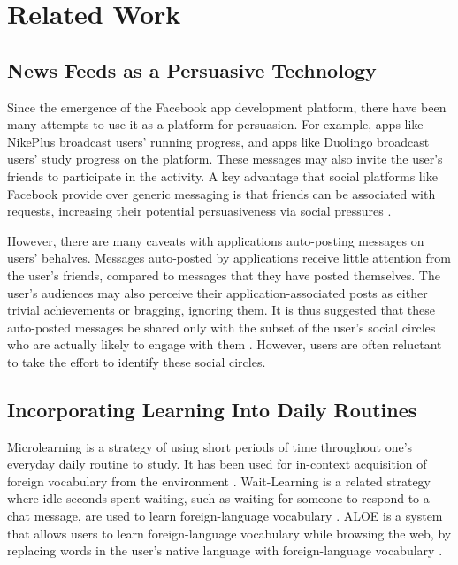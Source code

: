 \documentclass{sigchi}
\begin{document}
\section{Related Work}

\subsection{News Feeds as a Persuasive Technology}

Since the emergence of the Facebook app development platform, there have been
many attempts to use it as a platform for persuasion. For example, apps like NikePlus broadcast users' running progress, and apps like Duolingo broadcast users' study progress on the platform. These messages may also invite the user's friends to participate in the activity. A key advantage that social platforms like Facebook provide over generic messaging is that friends can be associated with requests, increasing their potential persuasiveness via social pressures \cite{foggfacebook}.

However, there are many caveats with applications auto-posting messages on users' behalves. Messages auto-posted by applications receive little attention from the user's friends, compared to messages that they have posted themselves. The user's audiences may also perceive their application-associated posts as either trivial achievements or bragging, ignoring them. It is thus suggested that these auto-posted messages be shared only with the subset of the user's social circles who are actually likely to engage with them \cite{socialsharing}. However, users are often reluctant to take the effort to identify these social circles.

\subsection{Incorporating Learning Into Daily Routines}

Microlearning is a strategy of using short periods of time throughout one's everyday daily routine to study. It has been used for in-context acquisition of foreign vocabulary from the environment \cite{microlearning} \cite{micromandarin}. Wait-Learning is a related strategy where idle seconds spent waiting, such as waiting for someone to respond to a chat message, are used to learn foreign-language vocabulary \cite{waitlearning}. ALOE is a system that allows users to learn foreign-language vocabulary while browsing the web, by replacing words in the user's native language with foreign-language vocabulary \cite{augmenting}.
\end{document}
